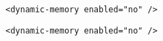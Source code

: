 \begin{verbatim}
<dynamic-memory enabled="no" />
\end{verbatim}
\begin{verbatim}
<dynamic-memory enabled="no" />
\end{verbatim}

